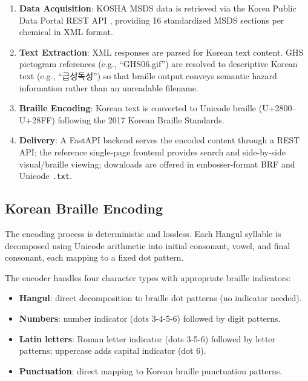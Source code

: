 \documentclass[journal]{IEEEtran}
\begin{document}
\begin{enumerate}
\item \textbf{Data Acquisition}: KOSHA MSDS data is retrieved via the Korea Public Data Portal REST API \cite{data_go_kr}, providing 16 standardized MSDS sections per chemical in XML format.

\item \textbf{Text Extraction}: XML responses are parsed for Korean text content. GHS pictogram references (e.g., ``GHS06.gif'') are resolved to descriptive Korean text (e.g., ``{급성독성}'') so that braille output conveys semantic hazard information rather than an unreadable filename.

\item \textbf{Braille Encoding}: Korean text is converted to Unicode braille (U+2800--U+28FF) following the 2017 Korean Braille Standards.

\item \textbf{Delivery}: A FastAPI backend serves the encoded content through a REST API; the reference single-page frontend provides search and side-by-side visual/braille viewing; downloads are offered in embosser-format BRF and Unicode \texttt{.txt}.
\end{enumerate}

\subsection{Korean Braille Encoding}

The encoding process is deterministic and lossless. Each Hangul syllable is decomposed using Unicode arithmetic into initial consonant, vowel, and final consonant, each mapping to a fixed dot pattern.

The encoder handles four character types with appropriate braille indicators:

\begin{itemize}
\item \textbf{Hangul}: direct decomposition to braille dot patterns (no indicator needed).
\item \textbf{Numbers}: number indicator (dots 3-4-5-6) followed by digit patterns.
\item \textbf{Latin letters}: Roman letter indicator (dots 3-5-6) followed by letter patterns; uppercase adds capital indicator (dot 6).
\item \textbf{Punctuation}: direct mapping to Korean braille punctuation patterns.
\end{itemize}
\end{document}
